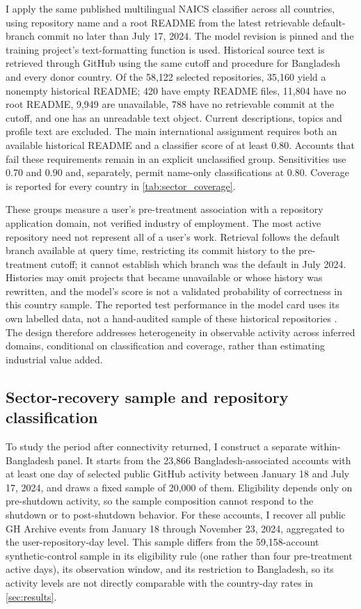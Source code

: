 I apply the same published multilingual NAICS classifier across all countries, using repository name and a root README from the latest retrievable default-branch commit no later than July 17, 2024. The model revision is pinned and the training project's text-formatting function is used. Historical source text is retrieved through GitHub using the same cutoff and procedure for Bangladesh and every donor country. Of the 58,122 selected repositories, 35,160 yield a nonempty historical README; 420 have empty README files, 11,804 have no root README, 9,949 are unavailable, 788 have no retrievable commit at the cutoff, and one has an unreadable text object. Current descriptions, topics and profile text are excluded. The main international assignment requires both an available historical README and a classifier score of at least 0.80. Accounts that fail these requirements remain in an explicit unclassified group. Sensitivities use 0.70 and 0.90 and, separately, permit name-only classifications at 0.80. Coverage is reported for every country in \cref{tab:sector_coverage}.

These groups measure a user's pre-treatment association with a repository application domain, not verified industry of employment. The most active repository need not represent all of a user's work. Retrieval follows the default branch available at query time, restricting its commit history to the pre-treatment cutoff; it cannot establish which branch was the default in July 2024. Histories may omit projects that became unavailable or whose history was rewritten, and the model's score is not a validated probability of correctness in this country sample. The reported test performance in the model card uses its own labelled data, not a hand-audited sample of these historical repositories \citep{quispe2026naics}. The design therefore addresses heterogeneity in observable activity across inferred domains, conditional on classification and coverage, rather than estimating industrial value added.

\subsection{Sector-recovery sample and repository classification}
\label{sec:sector_data}

To study the period after connectivity returned, I construct a separate within-Bangladesh panel. It starts from the 23,866 Bangladesh-associated accounts with at least one day of selected public GitHub activity between January 18 and July 17, 2024, and draws a fixed sample of 20,000 of them. Eligibility depends only on pre-shutdown activity, so the sample composition cannot respond to the shutdown or to post-shutdown behavior. For these accounts, I recover all public GH Archive events from January 18 through November 23, 2024, aggregated to the user-repository-day level.
This sample differs from the 59,158-account synthetic-control sample in its eligibility rule (one rather than four pre-treatment active days), its observation window, and its restriction to Bangladesh, so its activity levels are not directly comparable with the country-day rates in \cref{sec:results}.

